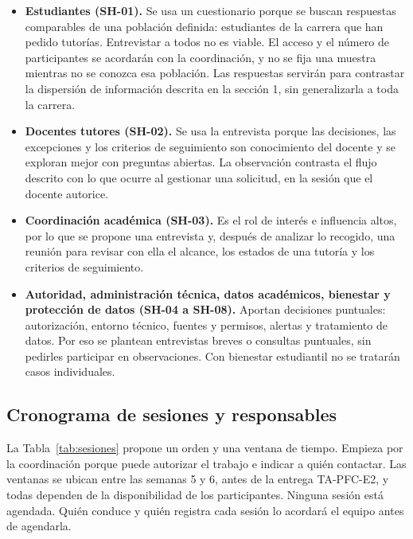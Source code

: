 \documentclass[11pt,a4paper]{article}
\begin{document}
\begin{itemize}

    \item \textbf{Estudiantes (SH-01).} Se usa un cuestionario porque se buscan respuestas comparables de una población definida: estudiantes de la carrera que han pedido tutorías. Entrevistar a todos no es viable. El acceso y el número de participantes se acordarán con la coordinación, y no se fija una muestra mientras no se conozca esa población. Las respuestas servirán para contrastar la dispersión de información descrita en la sección 1, sin generalizarla a toda la carrera.

    \item \textbf{Docentes tutores (SH-02).} Se usa la entrevista porque las decisiones, las excepciones y los criterios de seguimiento son conocimiento del docente y se exploran mejor con preguntas abiertas. La observación contrasta el flujo descrito con lo que ocurre al gestionar una solicitud, en la sesión que el docente autorice.

    \item \textbf{Coordinación académica (SH-03).} Es el rol de interés e influencia altos, por lo que se propone una entrevista y, después de analizar lo recogido, una reunión para revisar con ella el alcance, los estados de una tutoría y los criterios de seguimiento.

    \item \textbf{Autoridad, administración técnica, datos académicos, bienestar y protección de datos (SH-04 a SH-08).} Aportan decisiones puntuales: autorización, entorno técnico, fuentes y permisos, alertas y tratamiento de datos. Por eso se plantean entrevistas breves o consultas puntuales, sin pedirles participar en observaciones. Con bienestar estudiantil no se tratarán casos individuales.

\end{itemize}

\subsection{Cronograma de sesiones y responsables}

La Tabla~\ref{tab:sesiones} propone un orden y una ventana de tiempo. Empieza por la coordinación porque puede autorizar el trabajo e indicar a quién contactar. Las ventanas se ubican entre las semanas 5 y 6, antes de la entrega TA-PFC-E2, y todas dependen de la disponibilidad de los participantes. Ninguna sesión está agendada. Quién conduce y quién registra cada sesión lo acordará el equipo antes de agendarla.
\end{document}
